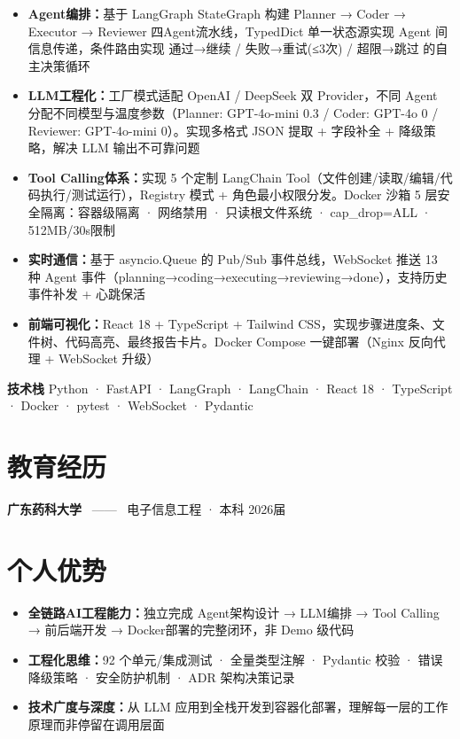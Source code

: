 \documentclass[11pt,a4paper]{article}
\begin{document}
\begin{itemize}[leftmargin=10pt]
  \item \textbf{Agent编排：}基于 LangGraph StateGraph 构建 Planner → Coder → Executor → Reviewer 四Agent流水线，TypedDict 单一状态源实现 Agent 间信息传递，条件路由实现 通过→继续 / 失败→重试(≤3次) / 超限→跳过 的自主决策循环

  \item \textbf{LLM工程化：}工厂模式适配 OpenAI / DeepSeek 双 Provider，不同 Agent 分配不同模型与温度参数（Planner: GPT-4o-mini 0.3 / Coder: GPT-4o 0 / Reviewer: GPT-4o-mini 0）。实现多格式 JSON 提取 + 字段补全 + 降级策略，解决 LLM 输出不可靠问题

  \item \textbf{Tool Calling体系：}实现 5 个定制 LangChain Tool（文件创建/读取/编辑/代码执行/测试运行），Registry 模式 + 角色最小权限分发。Docker 沙箱 5 层安全隔离：容器级隔离 · 网络禁用 · 只读根文件系统 · cap\_drop=ALL · 512MB/30s限制

  \item \textbf{实时通信：}基于 asyncio.Queue 的 Pub/Sub 事件总线，WebSocket 推送 13 种 Agent 事件（planning→coding→executing→reviewing→done），支持历史事件补发 + 心跳保活

  \item \textbf{前端可视化：}React 18 + TypeScript + Tailwind CSS，实现步骤进度条、文件树、代码高亮、最终报告卡片。Docker Compose 一键部署（Nginx 反向代理 + WebSocket 升级）
\end{itemize}

\vspace{2pt}
{\footnotesize\color{textsecondary} \textbf{技术栈} \quad Python · FastAPI · LangGraph · LangChain · React 18 · TypeScript · Docker · pytest · WebSocket · Pydantic}

\section{教育经历}

\noindent
{\bfseries 广东药科大学} \ —— \ 电子信息工程 · 本科 \hfill {\small\color{textsecondary}2026届}

\section{个人优势}

\begin{itemize}[leftmargin=10pt]
  \item \textbf{全链路AI工程能力：}独立完成 Agent架构设计 → LLM编排 → Tool Calling → 前后端开发 → Docker部署的完整闭环，非 Demo 级代码

  \item \textbf{工程化思维：}92 个单元/集成测试 · 全量类型注解 · Pydantic 校验 · 错误降级策略 · 安全防护机制 · ADR 架构决策记录

  \item \textbf{技术广度与深度：}从 LLM 应用到全栈开发到容器化部署，理解每一层的工作原理而非停留在调用层面
\end{itemize}
\end{document}
